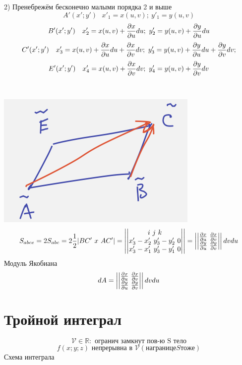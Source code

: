 \documentclass{article}
\begin{document}
2) Пренебрежём бесконечно малыми порядка 2 и выше
\begin{equation*}
    A'(x';y')\ \ \ x'_1 = x(u, v);\ y'_1 = y(u, v)
\end{equation*}
\begin{equation*}
    B'(x';y')\ \ \ x'_2 = x(u, v) + \pdv{x}{u}du;\ y'_2 = y(u, v) + \pdv{y}{u}du
\end{equation*}
\begin{equation*}
    C'(x';y')\ \ \ x'_3 = x(u, v) + \pdv{x}{u}du + \pdv{x}{v}dv;\ y'_3 = y(u, v) + \pdv{y}{u}du + \pdv{y}{v}dv;
\end{equation*}
\begin{equation*}
    E'(x';y')\ \ \ x'_4 = x(u, v) + \pdv{x}{v}dv;\ y'_4 = y(u, v) + \pdv{y}{v}dv
\end{equation*}
\\ \\
\includegraphics[width=.3\textwidth]{paral.png} 
\begin{equation*}
    S_{abce}= 2 S_{abc} = 2\frac{1}{2}|BC'\ x \ AC'| = 
    \left|\left|\begin{matrix}
        i\ j\ k\\
        x'_3-x_2'\ y'_3-y_2'\ 0\\
        x'_3-x_1'\ y'_3-y_1'\ 0
    \end{matrix}\right|\right|= 
    \left|\left|\begin{matrix}
        \pdv{x}{u}\ \pdv{x}{v}\\
        \pdv{y}{u}\ \pdv{y}{v}
    \end{matrix}\right|\right|dvdu
\end{equation*}
Модуль Якобиана
\begin{equation*}
    dA =  
    \left|\left|\begin{matrix}
        \pdv{x}{u}\ \pdv{x}{v}\\
        \pdv{y}{u}\ \pdv{y}{v}
    \end{matrix}\right|\right|dvdu
\end{equation*}
\section{Тройной интеграл}
\begin{equation*}
    \mathcal{V} \in \mathbb{R}:\text{ огранич замкнут пов-ю S тело}
\end{equation*}
\begin{equation*}
    f(x;y;z) \text{ непрерывна в $\mathcal{V}(на границе S тоже)$}
\end{equation*}
Схема интеграла
\end{document}
